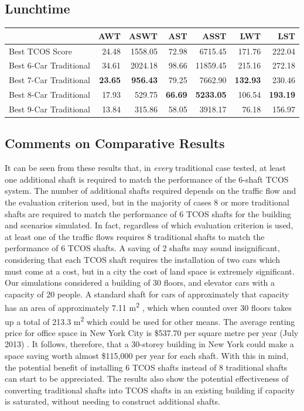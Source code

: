\documentclass{UoYCSproject}
\begin{document}
\subsection{Lunchtime}
\begin{tabular}{l | r r r r r r}
    & AWT & ASWT & AST & ASST & LWT & LST \\
	\hline
    Best TCOS Score & 24.48 & 1558.05 & 72.98 & 6715.45 & 171.76 & 222.04 \\
	\hline
    Best 6-Car Traditional & 34.61 & 2024.18 & 98.66 & 11859.45 & 215.16 & 272.18 \\
    Best 7-Car Traditional & \textbf{23.65} & \textbf{956.43} & 79.25 & 7662.90 & \textbf{132.93} & 230.46 \\
    Best 8-Car Traditional & 17.93 & 529.75 & \textbf{66.69} & \textbf{5233.05} & 106.54 & \textbf{193.19} \\
    Best 9-Car Traditional & 13.84 & 315.86 & 58.05 & 3918.17 & 76.18 & 156.97
\end{tabular}

\subsection{Comments on Comparative Results}

It can be seen from these results that, in \textit{every} traditional case tested, at least one additional shaft is required to match the performance of the 6-shaft TCOS system.  The number of additional shafts required depends on the traffic flow and the evaluation criterion used, but in the majority of cases 8 or more traditional shafts are required to match the performance of 6 TCOS shafts for the building and scenarios simulated.  In fact, regardless of which evaluation criterion is used, at least one of the traffic flows requires 8 traditional shafts to match the performance of 6 TCOS shafts.  A saving of 2 shafts may sound insignificant, considering that each TCOS shaft requires the installation of two cars which must come at a cost, but in a city the cost of land space is extremely significant.  Our simulations considered a building of 30 floors, and elevator cars with a capacity of 20 people.  A standard shaft for cars of approximately that capacity has an area of approximately 7.11 m\textsuperscript{2} \citep{StannahFactSheet}, which when counted over 30 floors takes up a total of 213.3 m\textsuperscript{2} which could be used for other means.  The average renting price for office space in New York City is \$537.70 per square metre per year (July 2013) \citep{Patrick2013OfficeSpace}.  It follows, therefore, that a 30-storey building in New York could make a space saving worth almost \$115,000 per year for each shaft.  With this in mind, the potential benefit of installing 6 TCOS shafts instead of 8 traditional shafts can start to be appreciated.  The results also show the potential effectiveness of converting traditional shafts into TCOS shafts in an existing building if capacity is saturated, without needing to construct additional shafts.
\end{document}
